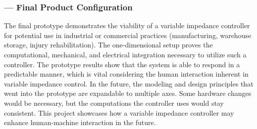 \subsubsection*{ --- Final Product Configuration}
The final prototype demonstrates the viability of a variable impedance controller for potential use in industrial or commercial practices (manufacturing, warehouse storage, injury rehabilitation). The one-dimensional setup proves the computational, mechanical, and electrical integration necessary to utilize such a controller. The prototype results show that the system is able to respond in a predictable manner, which is vital considering the human interaction inherent in variable impedance control. In the future, the modeling and design principles that went into the prototype are expandable to multiple axes. Some hardware changes would be necessary, but the computations the controller uses would stay consistent. This project showcases how a variable impedance controller may enhance human-machine interaction in the future. 